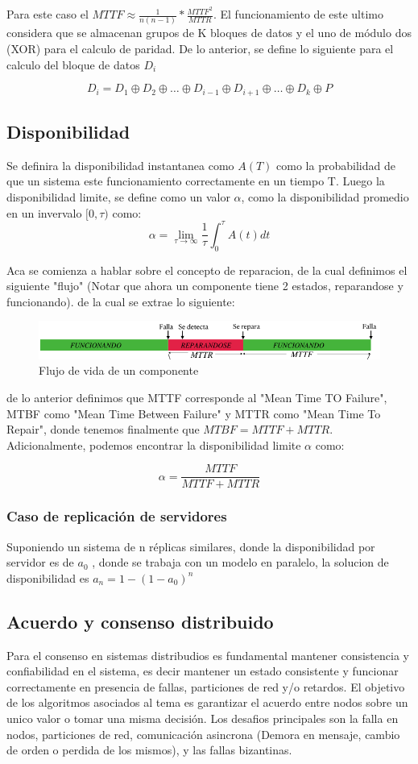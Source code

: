 Para este caso el $MTTF\approx\frac{1}{n(n-1)}*\frac{MTTF^2}{MTTR}$. El funcionamiento de este ultimo considera que se almacenan grupos de K bloques de datos y el uno de módulo dos (XOR) para el calculo de paridad. De lo anterior, se define lo siguiente para el calculo del bloque de datos $D_i$

\[
    D_i = D_1 \oplus D_2 \oplus \dots \oplus D_{i-1} \oplus D_{i+1} \oplus \dots \oplus D_k \oplus P
\]

\subsection{Disponibilidad}
Se definira la disponibilidad instantanea como $A(T)$ como la probabilidad de que un sistema este funcionamiento correctamente en un tiempo T. Luego la disponibilidad limite, se define como un valor $\alpha$, como la disponibilidad promedio en un invervalo $[0,\tau)$ como:
\[
    \alpha= \lim_{\tau \rightarrow \infty} \frac{1}{\tau}\int_{0}^{\tau}A(t)dt
\]

Aca se comienza a hablar sobre el concepto de reparacion, de la cual definimos el siguiente "flujo" (Notar que ahora un componente tiene 2 estados, reparandose y funcionando). de la cual se extrae lo siguiente:
\begin{figure}[H]
    \centering
    \includegraphics[width=0.5\linewidth]{img/MTTF.png}
    \caption{Flujo de vida de un componente}\label{fig:1761836148913}
\end{figure}
de lo anterior definimos que MTTF corresponde al "Mean Time TO Failure", MTBF como "Mean Time Between Failure" y MTTR como "Mean Time To Repair", donde tenemos finalmente que $MTBF= MTTF + MTTR$. Adicionalmente, podemos encontrar la disponibilidad limite $\alpha$ como:

\[
    \alpha = \frac{MTTF}{MTTF+MTTR}
\]

\subsubsection{Caso de replicación de servidores}
Suponiendo un sistema de n réplicas similares, donde la disponibilidad por servidor es de $a_0$ , donde se trabaja con un modelo en paralelo, la solucion de disponibilidad es $a_n=1-(1-a_0)^n$

\subsection{Acuerdo y consenso distribuido}
Para el consenso  en sistemas distribudios es fundamental mantener consistencia y confiabilidad en el sistema, es decir mantener un estado consistente y funcionar correctamente en presencia de fallas, particiones de red y/o retardos. El objetivo de los algoritmos asociados al tema es garantizar el acuerdo entre nodos sobre un unico valor o tomar una misma decisión. Los desafios principales son la falla en nodos, particiones de red, comunicación asincrona (Demora en mensaje, cambio de orden o perdida de los mismos), y las fallas bizantinas.

